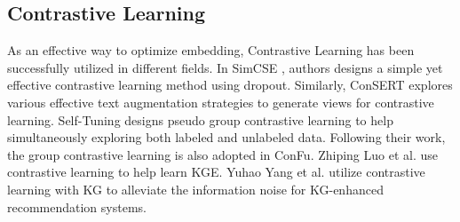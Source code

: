 
\subsection{Contrastive Learning} 
As an effective way to optimize embedding, Contrastive Learning has been successfully utilized in different fields. In SimCSE \cite{gao21}, authors designs a simple yet effective contrastive learning method using dropout. Similarly, ConSERT \cite{yan20} explores various effective text augmentation strategies to generate views for contrastive learning. Self-Tuning \cite{wang21} designs pseudo group contrastive learning to help simultaneously exploring both labeled and unlabeled data. Following their work, the group contrastive learning is also adopted in ConFu. Zhiping Luo et al. \cite{xu2021kge} use contrastive learning to help learn KGE. Yuhao Yang et al. \cite{yang2022knowledge} utilize contrastive learning with KG to alleviate the information noise for KG-enhanced recommendation systems.

